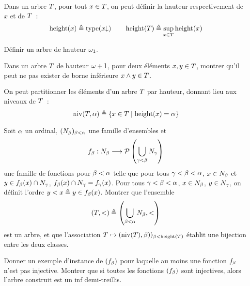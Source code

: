 \begin{problem}
  Dans un arbre $T$, pour tout $x \in T$, on peut définir la
  hauteur respectivement de $x$ et de $T$~:
  \[\operatorname{height}(x) \triangleq \operatorname{type}(x\mathbin{\downarrow})\qquad
  \operatorname{height}(T) \triangleq \sup_{x \in T} \operatorname{height}(x)\]
  \begin{pbQuest}[resume]
  \item Définir un arbre de hauteur $\omega_1$.
  \item Dans un arbre $T$ de hauteur $\omega+1$, pour deux éléments
    $x,y \in T$, montrer qu'il peut ne pas exister de borne inférieure
    $x\wedge y \in T$.
  \end{pbQuest}
  On peut partitionner les éléments d'un arbre $T$ par hauteur, donnant
  lieu aux niveaux de $T$~:
  \[\operatorname{niv}(T,\alpha) \triangleq \left\{ x \in T \;\middle\vert\; \operatorname{height}(x) = \alpha \right\}\]
  \begin{pbQuest}[resume]
  \item Soit $\alpha$ un ordinal, $(N_{\beta})_{\beta<\alpha}$ une famille
    d'ensembles et
    \[f_{\beta} : \displaystyle N_{\beta} \longrightarrow \mathcal{P}\left(\bigcup_{\gamma < \beta} N_{\gamma}\right)\]
    une famille de fonctions pour $\beta < \alpha$ telle que pour tous
    $\gamma < \beta < \alpha$, $x \in N_{\beta}$ et
    $y\in f_{\beta}(x)\cap N_{\gamma}$, $f_{\beta}(x)\cap N_{\gamma} = f_{\gamma}(x)$.
    Pour tous $\gamma < \beta < \alpha$, $x\in N_{\beta}$, $y\in N_{\gamma}$,
    on définit l'ordre $y < x \triangleq y \in f_{\beta}(x)$.
    Montrer que l'ensemble
    \[(T,<) \triangleq \left(\bigcup_{\beta < \alpha} N_{\beta}, <\right)\]
    est un arbre, et que l'association
    $T \mapsto (\operatorname{niv}(T),\beta))_{\beta < \operatorname{height}(T)}$
    établit une bijection entre les deux classes.
  \item Donner un exemple d'instance de $(f_{\beta})$ pour laquelle au moins
    une fonction $f_{\beta}$ n'est pas injective. Montrer que si toutes les
    fonctions $(f_{\beta})$ sont injectives, alors l'arbre construit est un
    inf demi-treillis.
  \end{pbQuest}


\end{problem}

